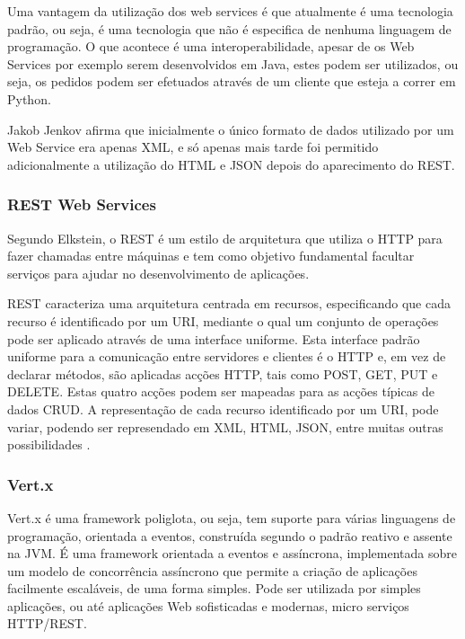 Uma vantagem da utilização dos web services é que atualmente é uma tecnologia padrão, ou seja, é uma tecnologia que não é especifica de nenhuma linguagem de programação. O que acontece é uma interoperabilidade, apesar de os Web Services por exemplo serem desenvolvidos em Java, estes podem ser utilizados, ou seja, os pedidos podem ser efetuados através de um cliente que esteja a correr em Python.

Jakob Jenkov \cite{wsjakob} afirma que inicialmente o único formato de dados utilizado por um Web Service era apenas \gls{XML}, e só apenas
mais tarde foi permitido adicionalmente a utilização do \gls{HTML} e \gls{JSON} depois do aparecimento do \gls{REST}.

\subsubsection{ REST Web Services}

Segundo Elkstein\cite{whatisrest}, o \gls{REST} é um estilo de arquitetura que utiliza o \gls{HTTP} para fazer chamadas entre máquinas e tem como objetivo fundamental facultar serviços para ajudar no desenvolvimento de aplicações.

\gls{REST} caracteriza uma arquitetura centrada em recursos, especificando que cada recurso é identificado por um \gls{URI}, mediante o qual um conjunto de operações pode ser aplicado através de uma interface uniforme. Esta interface padrão uniforme para a comunicação entre servidores e clientes é o \gls{HTTP} e, em vez de declarar métodos, são aplicadas acções \gls{HTTP}, tais como POST, GET, PUT e DELETE. Estas quatro acções podem ser mapeadas para as acções típicas de dados \gls{CRUD}. A representação de cada recurso identificado por um URI, pode variar, podendo ser represendado em \gls{XML}, \gls{HTML}, \gls{JSON}, entre muitas outras possibilidades \cite{restwebservices}.

\subsubsection{Vert.x}

Vert.x é uma framework poliglota, ou seja, tem suporte para várias linguagens de programação, orientada a eventos, construída segundo o padrão reativo e assente na \gls{JVM}. É uma framework orientada a eventos e assíncrona, implementada sobre um modelo de concorrência assíncrono que permite a criação de aplicações facilmente escaláveis, de uma forma simples. Pode ser utilizada por simples aplicações, ou até aplicações Web sofisticadas e modernas, micro serviços \gls{HTTP}/\gls{REST}.\cite{vertx-io}


